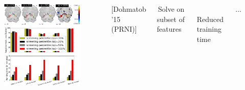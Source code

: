 \documentclass{beamer}
\def\mydot{\structure{\rule{1ex}{1ex}}\,}
\newcommand{\mycite}[1]{\textcolor{myblue}{[#1]}}
\begin{document}
\begin{frame}
\begin{columns}
\begin{overlayarea}{\textwidth}{\textheight}
{\begin{figure}
          \includegraphics[width=1\linewidth]{figures/haxby_sp.png}
        \end{figure}
      }      
    \end{overlayarea}
    \mycite{Dohmatob '15 (PRNI)}
    \bigskip
    

    \mydot Solve on subset of features
    
    \bigskip
    
    \mydot Reduced training time

    \bigskip
    
    \mydot ...
  \end{columns}
 
\end{frame}
\end{document}
